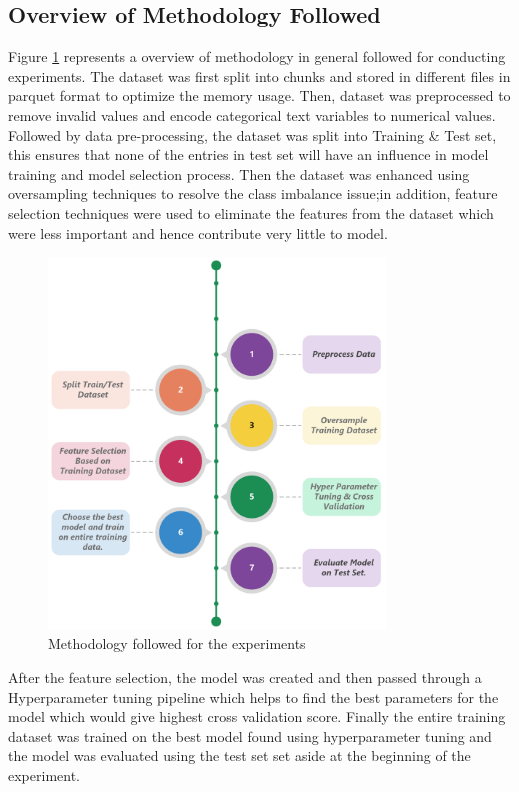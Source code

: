 \documentclass[twoside,11pt,a4paper]{article}
\begin{document}
\subsection{Overview of Methodology Followed}
Figure \ref{fig:methodology} represents a overview of methodology in general followed for conducting experiments. The dataset was first split into chunks and stored in different files in parquet format to optimize the memory usage. Then, dataset was preprocessed to remove invalid values and encode categorical text variables to numerical values. Followed by data pre-processing, the dataset was split into Training \& Test set, this ensures that none of the entries in test set will have an influence in model training and model selection process. Then the dataset was enhanced using oversampling techniques to resolve the class imbalance issue;in addition, feature selection techniques were used to eliminate the features from the dataset which were less important and hence contribute very little to model. 
\begin{figure}[ht]
	\centering
	\includegraphics[width=0.8\textwidth, height=0.5\textheight]{methodology}
	\caption[Methodology]{Methodology followed for the experiments}
	\label{fig:methodology}
\end{figure}

After the feature selection, the model was created and then passed through a Hyperparameter tuning pipeline which helps to find the best parameters for the model which would give highest cross validation score. Finally the entire training dataset was trained on the best model found using hyperparameter tuning and the model was evaluated using the test set set aside at the beginning of the experiment.
\end{document}
